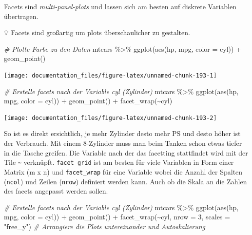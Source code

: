 \documentclass[
]{article}
\newenvironment{Shaded}{\begin{snugshade}}{\end{snugshade}}
\newcommand{\AttributeTok}[1]{\textcolor[rgb]{0.77,0.63,0.00}{#1}}
\newcommand{\CommentTok}[1]{\textcolor[rgb]{0.56,0.35,0.01}{\textit{#1}}}
\newcommand{\DecValTok}[1]{\textcolor[rgb]{0.00,0.00,0.81}{#1}}
\newcommand{\FunctionTok}[1]{\textcolor[rgb]{0.00,0.00,0.00}{#1}}
\newcommand{\NormalTok}[1]{#1}
\newcommand{\SpecialCharTok}[1]{\textcolor[rgb]{0.00,0.00,0.00}{#1}}
\newcommand{\StringTok}[1]{\textcolor[rgb]{0.31,0.60,0.02}{#1}}
\begin{document}
Facets sind \emph{multi-panel-plots} und lassen sich am besten auf diskrete Variablen übertragen.

💡 Facets sind großartig um plots überschaulicher zu gestalten.

\begin{Shaded}
\begin{Highlighting}[]
\CommentTok{\# Plotte Farbe zu den Daten}
\NormalTok{mtcars }\SpecialCharTok{\%\textgreater{}\%}
  \FunctionTok{ggplot}\NormalTok{(}\FunctionTok{aes}\NormalTok{(hp, mpg, }\AttributeTok{color =}\NormalTok{ cyl)) }\SpecialCharTok{+}
  \FunctionTok{geom\_point}\NormalTok{()}
\end{Highlighting}
\end{Shaded}

\begin{center}\texttt{[image: documentation\_files/figure-latex/unnamed-chunk-193-1]} \end{center}

\begin{Shaded}
\begin{Highlighting}[]
\CommentTok{\# Erstelle facets nach der Variable cyl (Zylinder)}
\NormalTok{mtcars }\SpecialCharTok{\%\textgreater{}\%}
  \FunctionTok{ggplot}\NormalTok{(}\FunctionTok{aes}\NormalTok{(hp, mpg, }\AttributeTok{color =}\NormalTok{ cyl)) }\SpecialCharTok{+}
  \FunctionTok{geom\_point}\NormalTok{() }\SpecialCharTok{+}
  \FunctionTok{facet\_wrap}\NormalTok{(}\SpecialCharTok{\textasciitilde{}}\NormalTok{cyl)}
\end{Highlighting}
\end{Shaded}

\begin{center}\texttt{[image: documentation\_files/figure-latex/unnamed-chunk-193-2]} \end{center}

So ist es direkt ersichtlich, je mehr Zylinder desto mehr PS und desto höher ist der Verbrauch. Mit einem 8-Zylinder muss man beim Tanken schon etwas tiefer in die Tasche greifen. Die Variable nach der das facetting stattfindet wird mit der Tile \texttt{\textasciitilde{}} verknüpft. \texttt{facet\_grid} ist am besten für viele Variablen in Form einer Matrix (m x n) und \texttt{facet\_wrap} für eine Variable wobei die Anzahl der Spalten (\texttt{ncol}) und Zeilen (\texttt{nrow}) definiert werden kann. Auch ob die Skala an die Zahlen des facets angepasst werden sollen.

\begin{Shaded}
\begin{Highlighting}[]
\CommentTok{\# Erstelle facets nach der Variable cyl (Zylinder)}
\NormalTok{mtcars }\SpecialCharTok{\%\textgreater{}\%}
  \FunctionTok{ggplot}\NormalTok{(}\FunctionTok{aes}\NormalTok{(hp, mpg, }\AttributeTok{color =}\NormalTok{ cyl)) }\SpecialCharTok{+}
  \FunctionTok{geom\_point}\NormalTok{() }\SpecialCharTok{+}
  \FunctionTok{facet\_wrap}\NormalTok{(}\SpecialCharTok{\textasciitilde{}}\NormalTok{cyl, }\AttributeTok{nrow =} \DecValTok{3}\NormalTok{, }\AttributeTok{scales =} \StringTok{"free\_y"}\NormalTok{) }\CommentTok{\# Arrangiere die Plots untereinander und Autoskalierung}
\end{Highlighting}
\end{Shaded}
\end{document}
